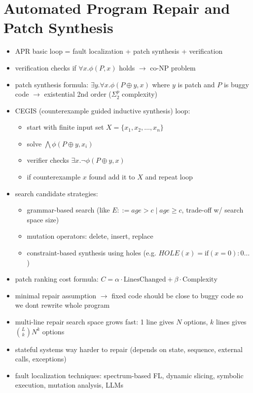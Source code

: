 
\setcounter{chapter}{6}
\chapter{Automated Program Repair and Patch Synthesis}

\begin{itemize}
\item APR basic loop = fault localization + patch synthesis + verification
\item verification checks if $\forall x.\phi(P,x)$ holds $\rightarrow$ co-NP problem
\item patch synthesis formula: $\exists y.\forall x.\phi(P\oplus y,x)$ where $y$ is patch and $P$ is buggy code $\rightarrow$ existential 2nd order ($\Sigma_2^p$ complexity)
\item CEGIS (counterexample guided inductive synthesis) loop:
\begin{itemize}
\item start with finite input set $X=\{x_1,x_2,\dots,x_n\}$
\item solve $\bigwedge \phi(P\oplus y, x_i)$
\item verifier checks $\exists x.\neg \phi(P\oplus y, x)$
\item if counterexample $x$ found add it to $X$ and repeat loop
\end{itemize}
\item search candidate strategies:
\begin{itemize}
\item grammar-based search (like $E ::= age > c \mid age \ge c$, trade-off w/ search space size)
\item mutation operators: delete, insert, replace
\item constraint-based synthesis using holes (e.g. $HOLE(x) = \text{if}(x=0):0 \dots$)
\end{itemize}
\item patch ranking cost formula: $C = \alpha \cdot \text{LinesChanged} + \beta \cdot \text{Complexity}$
\item minimal repair assumption $\rightarrow$ fixed code should be close to buggy code so we dont rewrite whole program
\item multi-line repair search space grows fast: 1 line gives $N$ options, $k$ lines gives $\binom{L}{k}N^k$ options
\item stateful systems way harder to repair (depends on state, sequence, external calls, exceptions)
\item fault localization techniques: spectrum-based FL, dynamic slicing, symbolic execution, mutation analysis, LLMs

\end{itemize}
